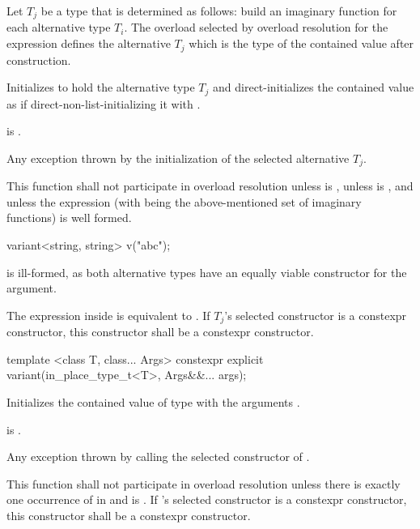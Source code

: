 \begin{itemdescr}
\pnum
Let $T_j$ be a type that is determined as follows:
build an imaginary function  for each alternative type $T_i$. The overload  selected by overload
resolution for the expression  defines
the alternative $T_j$ which is the type of the contained value after
construction.

\pnum
\effects
Initializes  to hold the alternative type $T_j$ and
direct-initializes the contained value as if direct-non-list-initializing it
with .

\pnum
\postconditions
{} is .

\pnum
\throws
Any exception thrown by the initialization of the selected alternative $T_j$.

\pnum
\remarks
This function shall not participate in overload resolution unless
 is , unless  is , and unless the expression
\brk{} (with 
being the above-mentioned set of imaginary functions) is well formed.

\pnum
\begin{note}
\begin{codeblock}
variant<string, string> v("abc");
\end{codeblock}
is ill-formed, as both alternative types have an equally viable constructor
for the argument. \end{note}

\pnum
The expression inside  is equivalent to
.
If $T_j$'s selected constructor is a constexpr constructor,
this constructor shall be a constexpr constructor.
\end{itemdescr}

%
\begin{itemdecl}
template <class T, class... Args> constexpr explicit variant(in_place_type_t<T>, Args&&... args);
\end{itemdecl}

\begin{itemdescr}
\pnum
\effects
Initializes the contained value of type  with the arguments .

\pnum
\postconditions
{} is .

\pnum
\throws
Any exception thrown by calling the selected constructor of .

\pnum
\remarks
This function shall not participate in overload resolution unless there is
exactly one occurrence of  in  and
 is .
If 's selected constructor is a constexpr constructor, this
constructor shall be a constexpr constructor.
\end{itemdescr}

